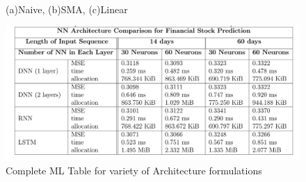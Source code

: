\begin{figure}[h]
  \centering
  \quad
  \\
  \quad
  \caption{(a)Naive, (b)SMA, (c)Linear}
  \label{fig: full_simple}
\end{figure}

\begin{figure}
    \centering
    \includegraphics[width=0.9\columnwidth]{appendix/simple_machine/ml_table.PNG}
    \caption{Complete ML Table for variety of Architecture formulations \cite{ml_paper}}
    \label{fig: full_machine}
\end{figure}

